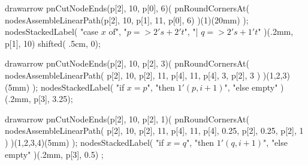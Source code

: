 drawarrow pnCutNodeEnds(p[2], 10, p[0], 6)(
  pnRoundCornersAt(
    nodesAssembleLinearPath(p[2], 10, p[1], 11, p[0], 6)
  )(1)(20mm)
);
nodesStackedLabel(
  "case $x$ of", "$p => 2's+2't$", "| $q => 2's+1't$"
)(.2mm, p[1], 10) shifted( .5cm, 0);

drawarrow pnCutNodeEnds(p[2], 10, p[2], 3)(
  pnRoundCornersAt(
    nodesAssembleLinearPath(
      p[2], 10, p[2], 11, p[4], 11, p[4], 3, p[2], 3
    )
  )(1,2,3)(5mm)
);
nodesStackedLabel(
  "if $x=p$", "then $1'(p,i+1)$", "else empty"
)(.2mm, p[3], 3.25);

drawarrow pnCutNodeEnds(p[2], 10, p[2], 1)(
  pnRoundCornersAt(
    nodesAssembleLinearPath(
      p[2], 10, p[2], 11, p[4], 11, p[4], 0.25, p[2], 0.25, p[2], 1
    )
  )(1,2,3,4)(5mm)
);
nodesStackedLabel(
  "if $x=q$", "then $1'(q,i+1)$", "else empty"
)(.2mm, p[3], 0.5) ;


\stopMPpage